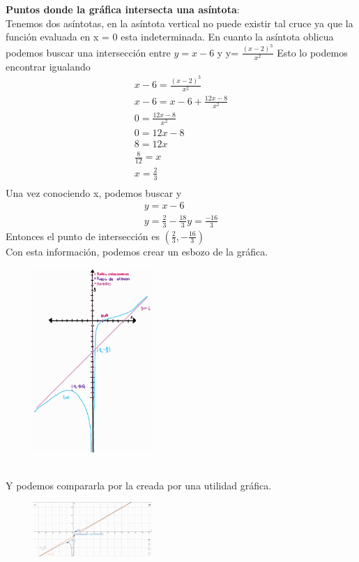 \documentclass[12pt]{article}
\begin{document}
\textbf{Puntos donde la gráfica intersecta una asíntota}:\\
Tenemos dos asíntotas, en la asíntota vertical no puede existir tal cruce ya que la función evaluada en x = 0 esta indeterminada.
En cuanto la asíntota oblicua podemos buscar una intersección entre $y =x-6$ y y= $\frac{(x-2)^3}{x^2} $
Esto lo podemos encontrar igualando
\begin{align*}
  x- 6= \frac{(x-2)^3}{x^2}\\
  x-6 = x  - 6 + \frac{12x-8}{x^2}\\
  0 = \frac{12x-8}{x^2}\\
  0 = 12x-8\\
  8 = 12x\\
  \frac{8}{12} = x\\
  x = \frac{2}{3} \\
\end{align*}
Una vez conociendo x, podemos buscar y
\begin{align*}
 y = x-6\\
 y =  \frac{2}{3} - \frac{18}{3}
 y= \frac{-16}{3}
\end{align*}
Entonces el punto de intersección es $\left( \frac{2}{3} , -\frac{16}{3}  \right)$\\
Con esta información, podemos crear un esbozo de la gráfica.\\
\begin{figure}[H]
\centering
\includegraphics[width=0.4\textwidth]{../img/img_Lista3/21_2.png}
\end{figure}
\\
Y podemos compararla por la creada por una utilidad gráfica.\\
\begin{figure}[H]
\centering
\includegraphics[width=0.4\textwidth]{../img/img_Lista3/21_1.png}
\end{figure}
\end{document}
